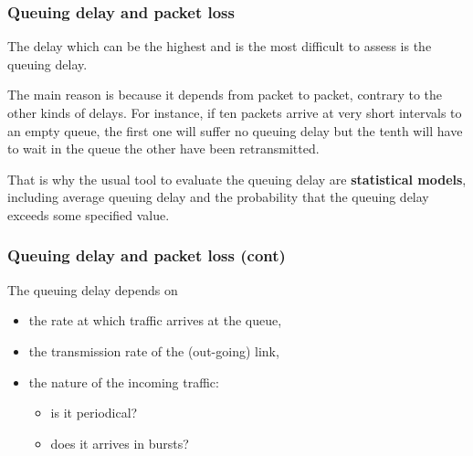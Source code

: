 %
\begin{frame}
\frametitle{Queuing delay and packet loss}

The delay which can be the highest and is the most difficult to assess
is the queuing delay.

\bigskip

The main reason is because it depends from
packet to packet, contrary to the other kinds of delays. For instance,
if ten packets arrive at very short intervals to an empty queue, the
first one will suffer no queuing delay but the tenth will have to wait
in the queue the other have been retransmitted.

\bigskip

That is why the usual tool to evaluate the queuing delay are
\textbf{statistical models}, including average queuing delay and the
probability that the queuing delay exceeds some specified value.

\end{frame}

%
\begin{frame}
\frametitle{Queuing delay and packet loss (cont)}

The queuing delay depends on
\begin{itemize}

  \item the rate at which traffic arrives at the queue,

  \item the transmission rate of the (out-going) link,

  \item the nature of the incoming traffic:

  \begin{itemize}

    \item is it periodical?

    \item does it arrives in bursts?

  \end{itemize}

\end{itemize}

\end{frame}

